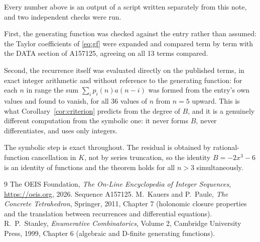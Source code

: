 \documentclass[11pt,a4paper]{article}
\theoremstyle{plain}
\theoremstyle{definition}
\begin{document}
Every number above is an output of a script written separately from this note, and two
independent checks were run.

First, the generating function was checked against the entry rather than assumed: the
Taylor coefficients of \eqref{eq:gf} were expanded and compared term by term with the DATA
section of A157125, agreeing on all 13 terms compared.

Second, the recurrence itself was evaluated directly on the published terms, in exact
integer arithmetic and without reference to the generating function: for each $n$ in range
the sum $\sum_{i}p_{i}(n)a(n-i)$ was formed from the entry's own values and found to
vanish, for all 36 values of $n$ from $n=5$ upward. This is what
Corollary~\ref{cor:criterion} predicts from the degree of $B$, and it is a genuinely
different computation from the symbolic one: it never forms $B$, never differentiates, and
uses only integers.

The symbolic step is exact throughout. The residual is obtained by rational-function
cancellation in $K$, not by series truncation, so the identity $B=- 2 x^{3} - 6$ is an
identity of functions and the theorem holds for all $n>3$ simultaneously.

\begin{thebibliography}{9}
 The OEIS Foundation, \emph{The On-Line Encyclopedia of Integer Sequences},
\url{https://oeis.org}, 2026. Sequence A157125.
 M.~Kauers and P.~Paule, \emph{The Concrete Tetrahedron}, Springer, 2011,
Chapter 7 (holonomic closure properties and the translation between recurrences and
differential equations).
 R.~P.~Stanley, \emph{Enumerative Combinatorics}, Volume 2, Cambridge
University Press, 1999, Chapter 6 (algebraic and D-finite generating functions).
\end{thebibliography}
\end{document}
